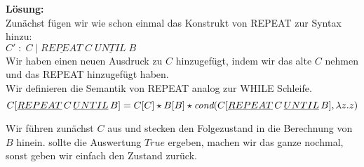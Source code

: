 \documentclass[11pt,a4paper,ngerman]{article}
\begin{document}
\textbf{Lösung:}\\

   Zunächst fügen wir wie schon einmal das Konstrukt von REPEAT zur
   Syntax hinzu:\\
   
   $C' \; : \; C \; | \;  \underline{REPEAT} \; C \; \underline{UNTIL} \; B$\\

   Wir haben einen neuen Ausdruck zu $C$ hinzugefügt, indem wir das alte $C$ nehmen
   und das REPEAT hinzugefügt haben.\\

   Wir definieren die Semantik von REPEAT analog zur WHILE Schleife.\\

   $$
      C [\underline{REPEAT} \, C \, \underline{UNTIL} \,B] 
         = C [C] \star B[B] \star \emph{cond} (C[\underline{REPEAT} \, C \, \underline{UNTIL} \, B],
            \lambda z.z)
   $$   

   Wir führen zunächst $C$ aus und stecken den Folgezustand in die Berechnung von $B$ hinein.
   sollte die Auswertung $True$ ergeben, machen wir das ganze nochmal, sonst geben wir
   einfach den Zustand zurück.


\label{LastPage}
\end{document}
